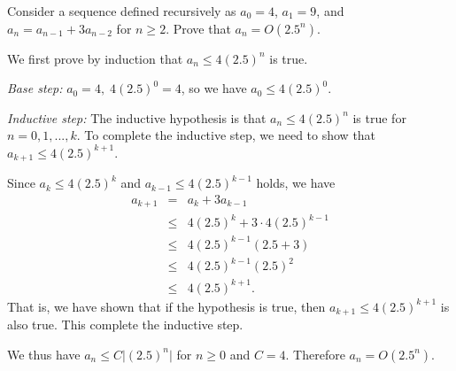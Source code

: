 \documentclass[11pt]{article}
\begin{document}
	

\medskip


\lineacross


\begin{problem}
Consider a sequence defined recursively as
$a_0 = 4$, $a_1 = 9$, and $a_n = a_{n-1}+3a_{n-2}$ for
$n\ge 2$. Prove that $a_n = O(2.5^n)$.
\end{problem}


\begin{solution}
We first prove by induction that $a_n \le 4(2.5)^n$ is true.

\noindent
\emph{Base step:} $a_0 = 4,\;4(2.5)^0=4$, so we have $a_0 \le 4(2.5)^0$.

\noindent
\emph{Inductive step:} The inductive hypothesis is that
$a_n \le 4(2.5)^n$ is true for $n=0,1,...,k$.
To complete the inductive step, we need to show that $a_{k+1}\le 4(2.5)^{k+1}$.

Since $a_k \le 4(2.5)^k$ and $a_{k-1} \le 4(2.5)^{k-1}$ holds, we have
%
\begin{eqnarray*}
a_{k+1}  &=& a_{k} + 3a_{k-1}
                \\
         &\le& 4(2.5)^k + 3\cdot4(2.5)^{k-1}
                \\
        &\le& 4(2.5)^{k-1}(2.5+3)
                \\
        &\le& 4(2.5)^{k-1}(2.5)^2
                \\
        &\le& 4(2.5)^{k+1}.
\end{eqnarray*}
%
That is, we have shown that if the hypothesis is true,
then $a_{k+1}\le 4(2.5)^{k+1}$ is also true.
This complete the inductive step.

We thus have $a_n \le C \vert{(2.5)^n}\vert $ for $n \ge 0$ and
$C = 4$. Therefore $a_n = O(2.5^n)$.
\end{solution}

\end{document}

